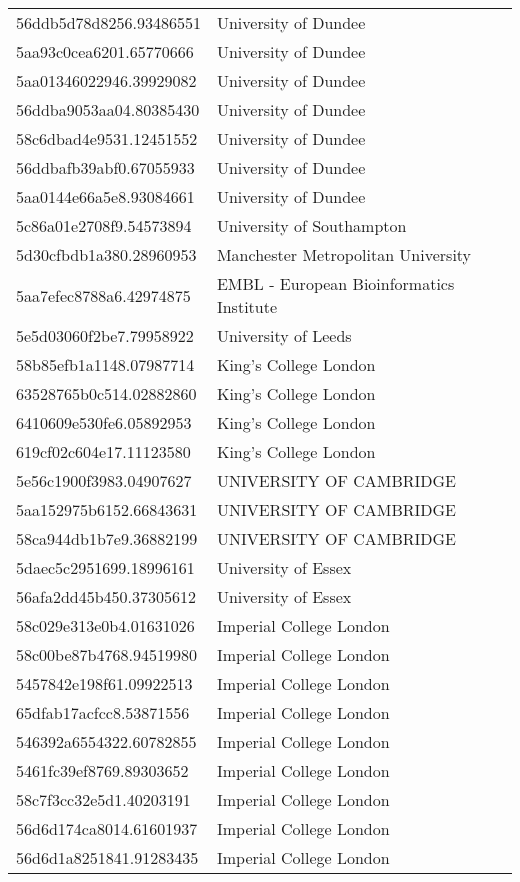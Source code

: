 \begin{tabular}{ll}
56ddb5d78d8256.93486551 & University of Dundee \\
5aa93c0cea6201.65770666 & University of Dundee \\
5aa01346022946.39929082 & University of Dundee \\
56ddba9053aa04.80385430 & University of Dundee \\
58c6dbad4e9531.12451552 & University of Dundee \\
56ddbafb39abf0.67055933 & University of Dundee \\
5aa0144e66a5e8.93084661 & University of Dundee \\
5c86a01e2708f9.54573894 & University of Southampton \\
5d30cfbdb1a380.28960953 & Manchester Metropolitan University \\
5aa7efec8788a6.42974875 & EMBL - European Bioinformatics Institute \\
5e5d03060f2be7.79958922 & University of Leeds \\
58b85efb1a1148.07987714 & King's College London \\
63528765b0c514.02882860 & King's College London \\
6410609e530fe6.05892953 & King's College London \\
619cf02c604e17.11123580 & King's College London \\
5e56c1900f3983.04907627 & UNIVERSITY OF CAMBRIDGE \\
5aa152975b6152.66843631 & UNIVERSITY OF CAMBRIDGE \\
58ca944db1b7e9.36882199 & UNIVERSITY OF CAMBRIDGE \\
5daec5c2951699.18996161 & University of Essex \\
56afa2dd45b450.37305612 & University of Essex \\
58c029e313e0b4.01631026 & Imperial College London \\
58c00be87b4768.94519980 & Imperial College London \\
5457842e198f61.09922513 & Imperial College London \\
65dfab17acfcc8.53871556 & Imperial College London \\
546392a6554322.60782855 & Imperial College London \\
5461fc39ef8769.89303652 & Imperial College London \\
58c7f3cc32e5d1.40203191 & Imperial College London \\
56d6d174ca8014.61601937 & Imperial College London \\
56d6d1a8251841.91283435 & Imperial College London \\

\end{tabular}
